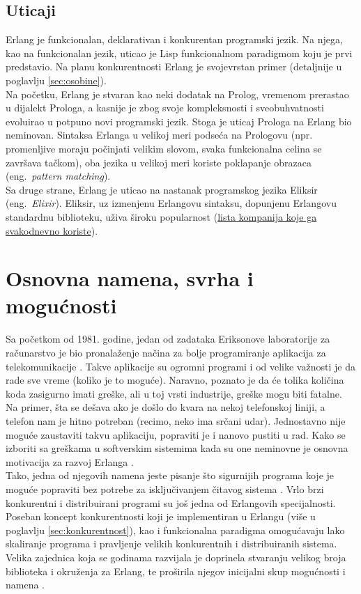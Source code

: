 \documentclass[a4paper]{article}
\begin{document}
{\subsection{Uticaji}
\label{subsec:uticaji}
Erlang je funkcionalan, deklarativan i konkurentan programski jezik.
Na njega, kao na funkcionalan jezik, uticao je Lisp funkcionalnom paradigmom koju je 
prvi predstavio. Na planu konkurentnosti Erlang je svojevrstan primer (detaljnije u poglavlju \ref{sec:osobine}). \\ 

Na početku, Erlang je stvaran kao neki dodatak na Prolog, vremenom prerastao u 
dijalekt Prologa, a kasnije je zbog svoje kompleksnosti i sveobuhvatnosti evoluirao
u potpuno novi programski jezik. Stoga je uticaj Prologa na Erlang bio 
neminovan. Sintaksa Erlanga u velikoj meri podseća na Prologovu 
(npr. promenljive moraju počinjati velikim slovom, 
svaka funkcionalna celina se završava tačkom), oba jezika u velikoj meri koriste poklapanje obrazaca
(eng.~{\em pattern matching}). \\

Sa druge strane, Erlang je uticao na nastanak programskog jezika Eliksir (eng.~{\em Elixir}). Eliksir,
uz izmenjenu Erlangovu sintaksu, dopunjenu Erlangovu standardnu biblioteku, uživa široku popularnost 
(\href{https://elixir-companies.com/}{lista kompanija koje ga svakodnevno koriste}). 

\section{Osnovna namena, svrha i mogućnosti}
\label{sec:namena}
Sa početkom od 1981. godine, jedan od zadataka Eriksonove laboratorije za računarstvo je bio pronalaženje načina za bolje programiranje aplikacija
za telekomunikacije \cite{phdthesis}. Takve aplikacije su ogromni programi i od velike važnosti je da rade sve vreme (koliko je to moguće). 
Naravno, poznato je da će tolika količina koda zasigurno imati greške, ali u toj vrsti industrije, greške mogu biti fatalne. Na primer, 
šta se dešava ako je došlo do kvara na nekoj telefonskoj liniji, a telefon nam je hitno potreban (recimo, neko ima srčani udar).
Jednostavno nije moguće zaustaviti takvu aplikaciju, popraviti je i nanovo pustiti u rad.
Kako se izboriti sa greškama u softverskim sistemima kada su one neminovne je osnovna motivacija za razvoj Erlanga \cite{phdthesis}. \\

Tako, jedna od njegovih namena jeste pisanje što sigurnijih programa koje je moguće popraviti bez potrebe za isključivanjem čitavog sistema \cite{book_joe}.
Vrlo brzi konkurentni i distribuirani programi su još jedna od Erlangovih specijalnosti. 
Poseban koncept konkurentnosti koji je implementiran u Erlangu (više u poglavlju \ref{sec:konkurentnost}), kao i funkcionalna paradigma 
omogućavaju lako skaliranje programa i pravljenje velikih konkurentnih i distribuiranih sistema.
Velika zajednica koja se godinama razvijala je doprinela stvaranju velikog broja biblioteka i okruženja za Erlang, te proširila njegov 
inicijalni skup mogućnosti i namena \cite{book_joe}. 


}
\end{document}
